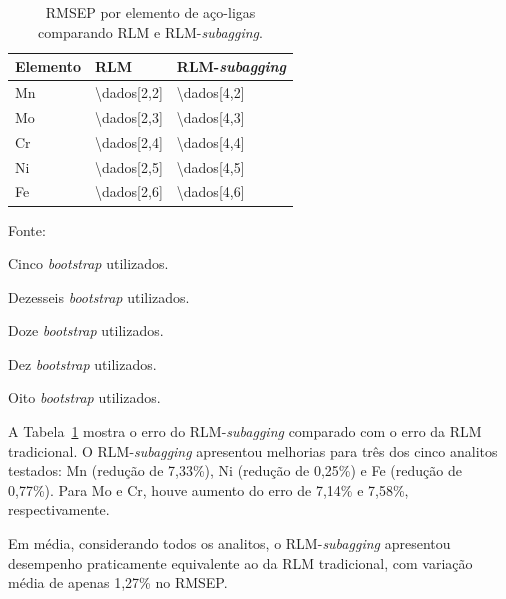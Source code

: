 \begin{table}[!htbp]
\centering
\small
\begin{threeparttable}
\caption{RMSEP por elemento de aço-ligas comparando RLM e RLM-\textit{subagging}.}
\label{tab:subagging}
\begin{tabular}{p{4cm} p{3cm} p{3cm}} %
\toprule
\textbf{Elemento} & \textbf{RLM} & \textbf{RLM-\textit{subagging}} \\ 
\midrule
Mn & \num{\dados[2,2]} & \num{\dados[4,2]} \tnote{a} \\ 
Mo & \num{\dados[2,3]} & \num{\dados[4,3]} \tnote{b} \\ 
Cr & \num{\dados[2,4]} & \num{\dados[4,4]} \tnote{c} \\ 
Ni & \num{\dados[2,5]} & \num{\dados[4,5]} \tnote{d} \\ 
Fe & \num{\dados[2,6]} & \num{\dados[4,6]} \tnote{e} \\ 
\bottomrule
\end{tabular}
\begin{tablenotes}[flushleft]
    \footnotesize
    \item \footnotesize{Fonte:~\oautor}
    \item[a] Cinco \textit{bootstrap} utilizados.
		\item[b] Dezesseis \textit{bootstrap} utilizados. 
		\item[c] Doze \textit{bootstrap} utilizados. 
		\item[d] Dez \textit{bootstrap} utilizados. 
		\item[e] Oito \textit{bootstrap} utilizados.
\end{tablenotes}
\end{threeparttable}
\end{table}


A Tabela~\ref{tab:subagging} mostra o erro do RLM-\textit{subagging} comparado com o erro da RLM tradicional. O RLM-\textit{subagging} apresentou melhorias para três dos cinco analitos testados: Mn (redução de 7,33\%), Ni (redução de 0,25\%) e Fe (redução de 0,77\%). Para Mo e Cr, houve aumento do erro de 7,14\% e 7,58\%, respectivamente.

Em média, considerando todos os analitos, o RLM-\textit{subagging} apresentou desempenho praticamente equivalente ao da RLM tradicional, com variação média de apenas 1,27\% no RMSEP.



